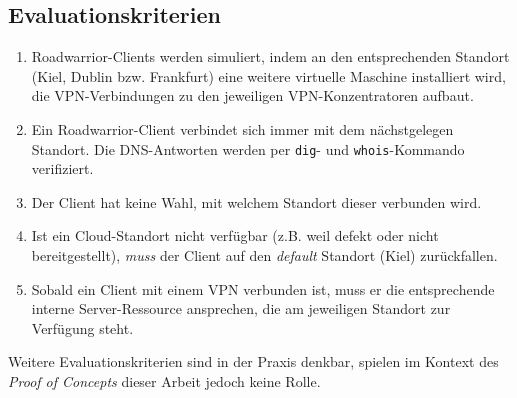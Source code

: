\subsection{Evaluationskriterien}\label{eval-roadwarrior}
\begin{enumerate}
\item \gls{Roadwarrior}-\gls{Client}s werden simuliert, indem an den entsprechenden Standort (Kiel, Dublin bzw. Frankfurt) eine weitere virtuelle Maschine installiert wird, die \gls{VPN}-Ver\-bin\-dungen zu den jeweiligen \gls{VPN-Konzentrator}en aufbaut.
\item Ein \gls{Roadwarrior}-\gls{Client} verbindet sich immer mit dem nächstgelegen Standort. Die \gls{DNS}-Antworten werden per \texttt{dig}- und \texttt{whois}-Kommando verifiziert.
\item Der \gls{Client} hat keine Wahl, mit welchem Standort dieser verbunden wird.
\item Ist ein Cloud-Standort nicht verfügbar (z.B. weil defekt oder nicht bereitgestellt), \textit{muss} der \gls{Client} auf den \textit{default} Standort (Kiel) zurückfallen.
\item Sobald ein \gls{Client} mit einem \gls{VPN} verbunden ist, muss er die entsprechende interne Server-Ressource ansprechen, die am jeweiligen Standort zur Verfügung steht.
\end{enumerate}

Weitere Evaluationskriterien sind in der Praxis denkbar, spielen im Kontext des \textit{Proof of Concepts} dieser Arbeit jedoch keine Rolle.
